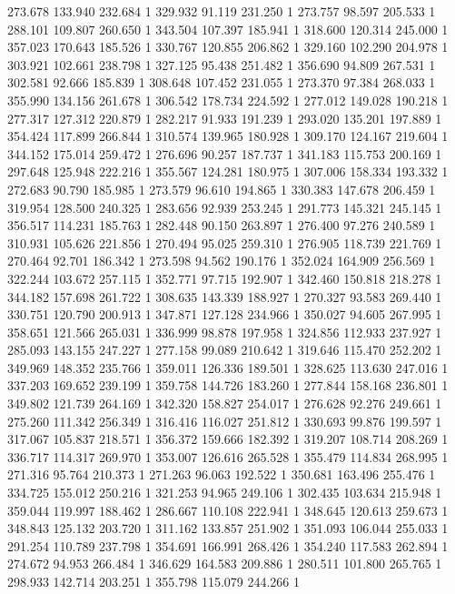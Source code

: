 	273.678	133.940	232.684	1
	329.932	91.119	231.250	1
	273.757	98.597	205.533	1
	288.101	109.807	260.650	1
	343.504	107.397	185.941	1
	318.600	120.314	245.000	1
	357.023	170.643	185.526	1
	330.767	120.855	206.862	1
	329.160	102.290	204.978	1
	303.921	102.661	238.798	1
	327.125	95.438	251.482	1
	356.690	94.809	267.531	1
	302.581	92.666	185.839	1
	308.648	107.452	231.055	1
	273.370	97.384	268.033	1
	355.990	134.156	261.678	1
	306.542	178.734	224.592	1
	277.012	149.028	190.218	1
	277.317	127.312	220.879	1
	282.217	91.933	191.239	1
	293.020	135.201	197.889	1
	354.424	117.899	266.844	1
	310.574	139.965	180.928	1
	309.170	124.167	219.604	1
	344.152	175.014	259.472	1
	276.696	90.257	187.737	1
	341.183	115.753	200.169	1
	297.648	125.948	222.216	1
	355.567	124.281	180.975	1
	307.006	158.334	193.332	1
	272.683	90.790	185.985	1
	273.579	96.610	194.865	1
	330.383	147.678	206.459	1
	319.954	128.500	240.325	1
	283.656	92.939	253.245	1
	291.773	145.321	245.145	1
	356.517	114.231	185.763	1
	282.448	90.150	263.897	1
	276.400	97.276	240.589	1
	310.931	105.626	221.856	1
	270.494	95.025	259.310	1
	276.905	118.739	221.769	1
	270.464	92.701	186.342	1
	273.598	94.562	190.176	1
	352.024	164.909	256.569	1
	322.244	103.672	257.115	1
	352.771	97.715	192.907	1
	342.460	150.818	218.278	1
	344.182	157.698	261.722	1
	308.635	143.339	188.927	1
	270.327	93.583	269.440	1
	330.751	120.790	200.913	1
	347.871	127.128	234.966	1
	350.027	94.605	267.995	1
	358.651	121.566	265.031	1
	336.999	98.878	197.958	1
	324.856	112.933	237.927	1
	285.093	143.155	247.227	1
	277.158	99.089	210.642	1
	319.646	115.470	252.202	1
	349.969	148.352	235.766	1
	359.011	126.336	189.501	1
	328.625	113.630	247.016	1
	337.203	169.652	239.199	1
	359.758	144.726	183.260	1
	277.844	158.168	236.801	1
	349.802	121.739	264.169	1
	342.320	158.827	254.017	1
	276.628	92.276	249.661	1
	275.260	111.342	256.349	1
	316.416	116.027	251.812	1
	330.693	99.876	199.597	1
	317.067	105.837	218.571	1
	356.372	159.666	182.392	1
	319.207	108.714	208.269	1
	336.717	114.317	269.970	1
	353.007	126.616	265.528	1
	355.479	114.834	268.995	1
	271.316	95.764	210.373	1
	271.263	96.063	192.522	1
	350.681	163.496	255.476	1
	334.725	155.012	250.216	1
	321.253	94.965	249.106	1
	302.435	103.634	215.948	1
	359.044	119.997	188.462	1
	286.667	110.108	222.941	1
	348.645	120.613	259.673	1
	348.843	125.132	203.720	1
	311.162	133.857	251.902	1
	351.093	106.044	255.033	1
	291.254	110.789	237.798	1
	354.691	166.991	268.426	1
	354.240	117.583	262.894	1
	274.672	94.953	266.484	1
	346.629	164.583	209.886	1
	280.511	101.800	265.765	1
	298.933	142.714	203.251	1
	355.798	115.079	244.266	1
